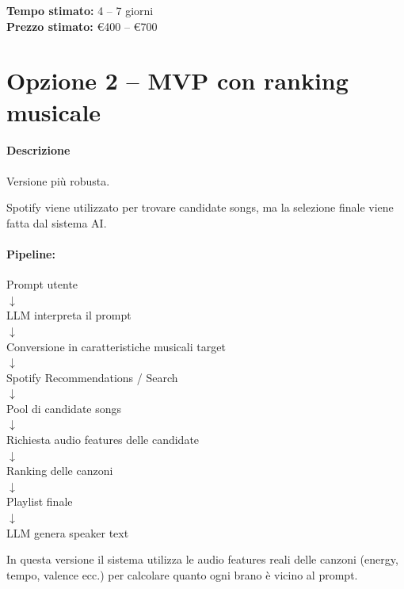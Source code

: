 \documentclass[11pt,a4paper]{article}
\begin{document}
\vspace{0.3cm}
\noindent \textbf{Tempo stimato:} 4 -- 7 giorni \\[0.2cm]
\noindent \textbf{Prezzo stimato:} €400 -- €700

\vspace{0.5cm}
\hrulefill
\vspace{0.5cm}

\section{Opzione 2 -- MVP con ranking musicale}

\paragraph{Descrizione}
Versione più robusta.

Spotify viene utilizzato per trovare candidate songs, ma la selezione finale viene fatta dal sistema AI.

\paragraph{Pipeline:}
\begin{center}
Prompt utente \\
$\downarrow$ \\
LLM interpreta il prompt \\
$\downarrow$ \\
Conversione in caratteristiche musicali target \\
$\downarrow$ \\
Spotify Recommendations / Search \\
$\downarrow$ \\
Pool di candidate songs \\
$\downarrow$ \\
Richiesta audio features delle candidate \\
$\downarrow$ \\
Ranking delle canzoni \\
$\downarrow$ \\
Playlist finale \\
$\downarrow$ \\
LLM genera speaker text
\end{center}

In questa versione il sistema utilizza le audio features reali delle canzoni (energy, tempo, valence ecc.) per calcolare quanto ogni brano è vicino al prompt.
\end{document}

